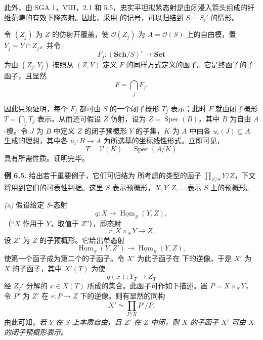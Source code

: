 此外，由 SGA 1，VIII，2.1 和 5.5，忠实平坦拟紧态射是由闭浸入箭头组成的纤维范畴的有效下降态射。因此，采用  的记号，可以归结到 \(S=S_i'\) 的情形。

令 \((Z_j)\) 为 \(Z\) 的仿射开覆盖，使 \(\mathcal O(Z_j)\) 为 \(A=\mathcal O(S)\) 上的自由模，置 \(Y_j=Y\cap Z_j\)，并令
\[
  F_j:(\mathbf{Sch}/S)^\circ\longrightarrow\mathbf{Set}
\]
为由 \((Z_j,Y_j)\) 按照从 \((Z,Y)\) 定义 \(F\) 的同样方式定义的函子。它是终函子的子函子，且显然
\[
  F=\bigcap_jF_j.
\]

因此只须证明，每个 \(F_j\) 都可由 \(S\) 的一个闭子概形 \(T_j\) 表示；此时 \(F\) 就由闭子概形 \(T=\bigcap_jT_j\) 表示。从而还可假设 \(Z\) 仿射，设为 \(Z=\operatorname{Spec}(B)\)，其中 \(B\) 为自由 \(A\)-模。令 \(J\) 为 \(B\) 中定义 \(Z\) 的闭子预概形 \(Y\) 的子集，\(K\) 为 \(A\) 中由各 \(u_i(J)\subseteq A\) 生成的理想，其中各 \(u_i:B\to A\) 为所选基的坐标线性形式。立即可见，
\[
  T=\mathcal V(K)=\operatorname{Spec}(A/K)
\]
具有所需性质。证明完毕。

\medskip
\noindent{}\textbf{例 6.5.}
给出若干重要例子，它们可归结为  所考虑的类型的函子 \(\prod_{Z/S}Y/Z\)，下文将用到它们的可表性判据。这里 \(S\) 表示预概形，\(X,Y,Z,\ldots\) 表示 \(S\) 上的预概形。

\smallskip
\noindent{}\textit{(a)}
假设给定 \(S\)-态射
\[
  q:X\longrightarrow\underline{\operatorname{Hom}}_S(Y,Z),
  \tag{x}\label{sga3:viii:examples:6:5:eq:x:01}
\]
（“\(X\) 作用于 \(Y\)，取值于 \(Z\)”），即态射
\[
  r:X\times_SY\longrightarrow Z.
  \tag{xx}\label{sga3:viii:examples:6:5:eq:xx:01}
\]
设 \(Z'\) 为 \(Z\) 的子预概形。它给出单态射
\[
  \underline{\operatorname{Hom}}_S(Y,Z')
  \longrightarrow
  \underline{\operatorname{Hom}}_S(Y,Z),
\]
使第一个函子成为第二个的子函子。令 \(X'\) 为此子函子在  下的逆像。于是 \(X'\) 为 \(X\) 的子函子，其中 \(X'(T)\) 为使
\[
  q(x):Y_T\longrightarrow Z_T
\]
经 \(Z_T'\) 分解的 \(x\in X(T)\) 所成的集合。此函子可作如下描述。置 \(P=X\times_SY\)，令 \(P'\) 为 \(Z'\) 在 \(r:P\to Z\) 下的逆像。则有显然的同构
\[
  X'\simeq\prod_{P/X}P'/P.
  \tag{xxx}\label{sga3:viii:examples:6:5:eq:xxx:01}
\]
由此可知，\textit{若 \(Y\) 在 \(S\) 上本质自由，且 \(Z'\) 在 \(Z\) 中闭，则 \(X\) 的子函子 \(X'\) 可由 \(X\) 的闭子预概形表示。}

